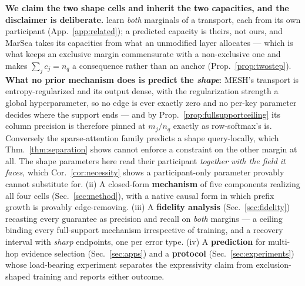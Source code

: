 \documentclass{article}
\begin{document}
\textbf{We claim the two shape cells and inherit the two capacities, and the disclaimer is
deliberate.} \citet{zhang2023mesh} learn \emph{both} marginals of a transport, each from its own
participant (App.~\ref{app:related}); a predicted capacity is theirs, not ours, and MarSea takes
its capacities from what an unmodified layer allocates --- which is what keeps an exclusive margin
commensurate with a non-exclusive one and makes $\sum_j c_j=n_q$ a consequence rather than an
anchor (Prop.~\ref{prop:twostep}). \textbf{What no prior mechanism does is predict the
\emph{shape}}: MESH's transport is entropy-regularized and its output dense, with the
regularization strength a global hyperparameter, so no edge is ever exactly zero and no per-key
parameter decides where the support ends --- and by
Prop.~\ref{prop:fullsupportceiling} its column precision is therefore pinned at $m_j/n_q$ exactly
as row-softmax's is. Conversely the sparse-attention family predicts a shape query-locally, which
Thm.~\ref{thm:separation} shows cannot enforce a constraint on the other margin at all. The
shape parameters here read their participant \emph{together with the field it faces}, which
Cor.~\ref{cor:necessity} shows a participant-only parameter provably cannot substitute for.
(ii) A closed-form \textbf{mechanism} of five components realizing all four cells
(Sec.~\ref{sec:method}), with a native causal form in which prefix growth is provably
edge-removing. (iii) A \textbf{fidelity analysis} (Sec.~\ref{sec:fidelity}) recasting every
guarantee as precision and recall on \emph{both} margins --- a ceiling binding every full-support
mechanism irrespective of training, and a recovery interval with \emph{sharp} endpoints, one per
error type. (iv) A \textbf{prediction} for multi-hop evidence selection (Sec.~\ref{sec:apps}) and
a \textbf{protocol} (Sec.~\ref{sec:experiments}) whose load-bearing experiment separates the
expressivity claim from exclusion-shaped training and reports either outcome.
\end{document}
